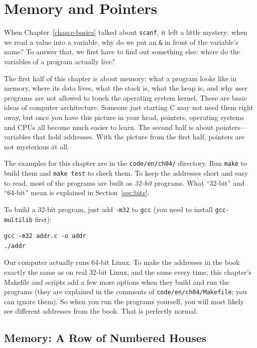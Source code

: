 \chapter{Memory and Pointers}
\label{chap:memory}

When Chapter~\ref{chap:c-basics} talked about \texttt{scanf}, it left a little mystery: when we read a value into a variable, why do we put an \texttt{\&} in front of the variable's name? To answer that, we first have to find out something else: where do the variables of a program actually live?

The first half of this chapter is about memory: what a program looks like in memory, where its data lives, what the stack is, what the heap is, and why user programs are not allowed to touch the operating system kernel. These are basic ideas of computer architecture. Someone just starting C may not need them right away, but once you have this picture in your head, pointers, operating systems and CPUs all become much easier to learn. The second half is about pointers---variables that hold addresses. With the picture from the first half, pointers are not mysterious at all.

The examples for this chapter are in the \texttt{code/en/ch04/} directory. Run \texttt{make} to build them and \texttt{make test} to check them. To keep the addresses short and easy to read, most of the programs are built as \emph{32-bit} programs. What ``32-bit'' and ``64-bit'' mean is explained in Section~\ref{sec:bits}.

To build a 32-bit program, just add \texttt{-m32} to \texttt{gcc} (you need to install \texttt{gcc-multilib} first):
\begin{verbatim}
gcc -m32 addr.c -o addr
./addr
\end{verbatim}
Our computer actually runs 64-bit Linux. To make the addresses in the book exactly the same as on real 32-bit Linux, and the same every time, this chapter's Makefile and scripts add a few more options when they build and run the programs (they are explained in the comments of \texttt{code/en/ch04/Makefile}; you can ignore them). So when you run the programs yourself, you will most likely see different addresses from the book. That is perfectly normal.

\section{Memory: A Row of Numbered Houses}
\label{sec:mem-street}

